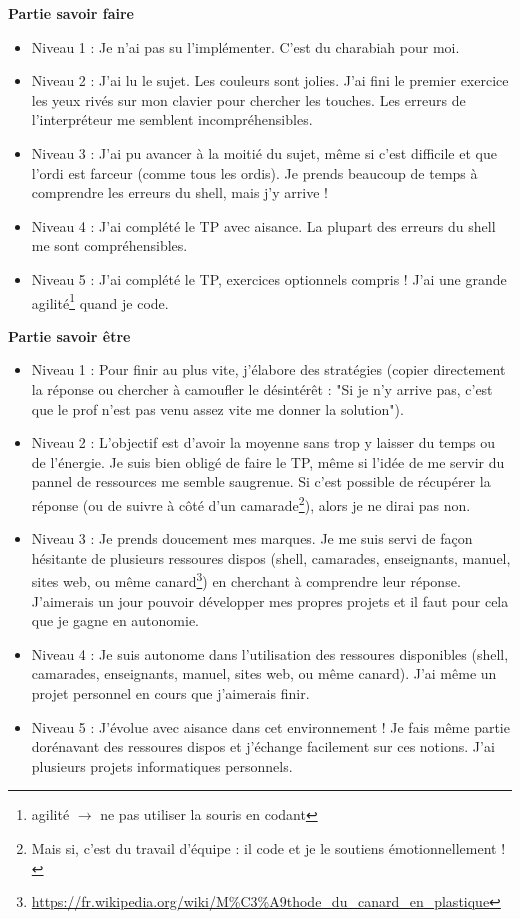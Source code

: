 \textbf{Partie savoir faire}
\begin{itemize}
    \item Niveau 1 : Je n'ai pas su l'implémenter. C'est du charabiah pour moi. 
    \item Niveau 2 : J'ai lu le sujet. Les couleurs sont jolies. J'ai fini le premier exercice les yeux rivés sur mon clavier pour chercher les touches. Les erreurs de l'interpréteur me semblent incompréhensibles.
    \item Niveau 3 : J'ai pu avancer à la moitié du sujet, même si c'est difficile et que l'ordi est farceur (comme tous les ordis). Je prends beaucoup de temps à comprendre les erreurs du shell, mais j'y arrive !
    \item Niveau 4 : J'ai complété le TP avec aisance. La plupart des erreurs du shell me sont compréhensibles.
    \item Niveau 5 : J'ai complété le TP, exercices optionnels compris ! J'ai une grande agilité\footnote{agilité $\rightarrow$ ne pas utiliser la souris en codant} quand je code. 
\end{itemize}


\textbf{Partie savoir être}
\begin{itemize}
    \item Niveau 1 :  Pour finir au plus vite, j'élabore des stratégies (copier directement la réponse ou chercher à camoufler le désintérêt : "Si je n'y arrive pas, c'est que le prof n'est pas venu assez vite me donner la solution"). 
    \item Niveau 2 : L'objectif est d'avoir la moyenne sans trop y laisser du temps ou de l'énergie. Je suis bien obligé de faire le TP, même si l'idée de me servir du pannel de ressources me semble saugrenue. Si c'est possible de récupérer la réponse (ou de suivre à côté d'un camarade\footnote{Mais si, c'est du travail d'équipe : il code et je le soutiens émotionnellement !}), alors je ne dirai pas non. 
    \item Niveau 3 : Je prends doucement mes marques. Je me suis servi de façon hésitante de plusieurs ressoures dispos (shell, camarades, enseignants, manuel, sites web, ou même canard\footnote{\url{https://fr.wikipedia.org/wiki/M\%C3\%A9thode_du_canard_en_plastique}}) en cherchant à comprendre leur réponse. J'aimerais un jour pouvoir développer  mes propres projets et il faut pour cela que je gagne en autonomie.
    \item Niveau 4 :   Je suis autonome dans l'utilisation des ressoures disponibles (shell, camarades, enseignants, manuel, sites web, ou même canard\footnotemark[7]). J'ai même un projet personnel en cours que j'aimerais finir.
    \item Niveau 5 : J'évolue avec aisance dans cet environnement ! Je  fais même partie dorénavant des ressoures dispos et  j'échange facilement sur ces notions. J'ai plusieurs projets informatiques personnels. 
\end{itemize}

